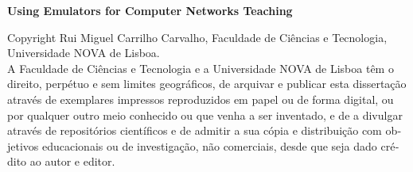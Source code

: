 \cleardoublepage\thispagestyle{empty}
\null
\vfill
\noindent\textbf{Using Emulators for Computer Networks Teaching}

\foreignlanguage{portuguese}{\noindent Copyright \textcopyright\xspace Rui Miguel Carrilho Carvalho, Faculdade de Ciências e Tecnologia, Universidade NOVA de Lisboa.\\
A Faculdade de Ciências e Tecnologia e a Universidade NOVA de Lisboa têm o direito, perpétuo e sem limites geográficos, de arquivar e publicar esta dissertação através de exemplares impressos reproduzidos em papel ou de forma digital, ou por qualquer outro meio conhecido ou que venha a ser inventado, e de a divulgar através de repositórios científicos e de admitir a sua cópia e distribuição com objetivos educacionais ou de investigação, não comerciais, desde que seja dado crédito ao autor e editor.}
